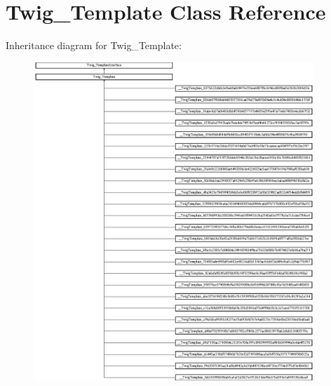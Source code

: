 \hypertarget{class_twig___template}{}\section{Twig\+\_\+\+Template Class Reference}
\label{class_twig___template}
Inheritance diagram for Twig\+\_\+\+Template\+:\begin{figure}[H]
\begin{center}
\leavevmode
\includegraphics[height=12.000000cm]{class_twig___template}
\end{center}
\end{figure}

